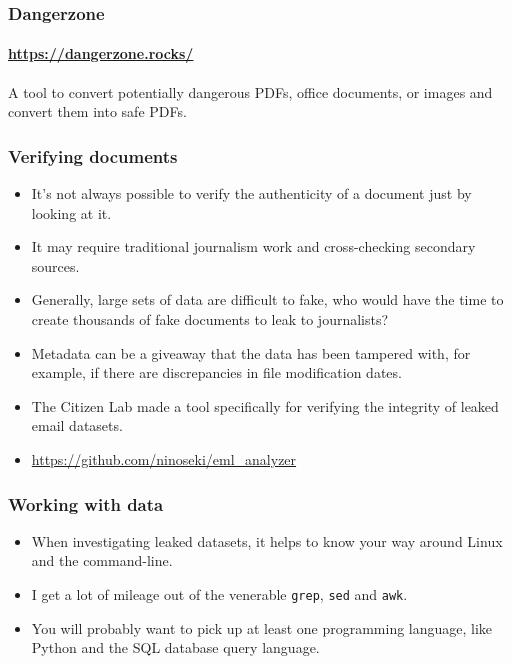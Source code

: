 \documentclass[aspectratio=169,usenames,dvipsnames]{beamer}
\begin{document}
\begin{frame}[c]
  \frametitle{Dangerzone}
  \framesubtitle{\url{https://dangerzone.rocks/}}

  A tool to convert potentially dangerous PDFs, office documents, or images
  and convert them into safe PDFs.

\end{frame}

\begin{frame}
  \frametitle{Verifying documents}

  \begin{itemize}[<+->]
    \item It's not always possible to verify the authenticity of a document
      just by looking at it.
    \item It may require traditional journalism work and cross-checking
      secondary sources.
    \item Generally, large sets of data are difficult to fake, who would
      have the time to create thousands of fake documents to leak to
      journalists?
    \item Metadata can be a giveaway that the data has been tampered with, for
      example, if there are discrepancies in file modification dates.
    \item The Citizen Lab made a tool specifically for verifying the integrity
      of leaked email datasets.
    \item \url{https://github.com/ninoseki/eml_analyzer}
  \end{itemize}

\end{frame}

\begin{frame}
  \frametitle{Working with data}

  \begin{itemize}[<+->]
    \item When investigating leaked datasets, it helps to know your way around
      Linux and the command-line.
    \item I get a lot of mileage out of the venerable \texttt{grep},
      \texttt{sed} and \texttt{awk}.
    \item You will probably want to pick up at least one programming language,
      like Python and the SQL database query language.
  \end{itemize}

\end{frame}
\end{document}
